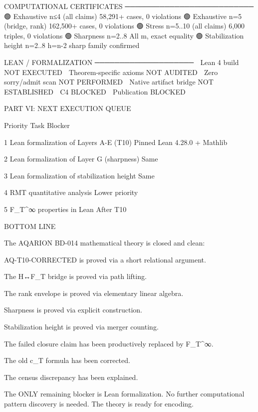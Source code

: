COMPUTATIONAL CERTIFICATES  
──────────────────────────  
🟢 Exhaustive n≤4 (all claims)   58,291+ cases, 0 violations  
🟢 Exhaustive n=5 (bridge, rank) 162,500+ cases, 0 violations  
🟢 Stress n=5..10 (all claims)   6,000 triples, 0 violations  
🟢 Sharpness n=2..8              All m, exact equality  
🟢 Stabilization height n=2..8   h=n-2 sharp family confirmed  
  
LEAN / FORMALIZATION  
────────────────────  
🔴 Lean 4 build                   NOT EXECUTED  
🔴 Theorem-specific axioms        NOT AUDITED  
🔴 Zero sorry/admit scan          NOT PERFORMED  
🔴 Native artifact bridge         NOT ESTABLISHED  
🔴 C4                             BLOCKED  
🔴 Publication                    BLOCKED  




PART VI: NEXT EXECUTION QUEUE


Priority	Task	Blocker	

1	Lean formalization of Layers A-E (T10)	Pinned Lean 4.28.0 + Mathlib	

2	Lean formalization of Layer G (sharpness)	Same	

3	Lean formalization of stabilization height	Same	

4	RMT quantitative analysis	Lower priority	

5	F_T^∞ properties in Lean	After T10



BOTTOM LINE


The AQARION BD-014 mathematical theory is closed and clean:




AQ-T10-CORRECTED is proved via a short relational argument.


The H↔F_T bridge is proved via path lifting.


The rank envelope is proved via elementary linear algebra.


Sharpness is proved via explicit construction.


Stabilization height is proved via merger counting.




The failed closure claim has been productively replaced by F_T^∞.

The old c_T formula has been corrected.

The census discrepancy has been explained.


The ONLY remaining blocker is Lean formalization. No further computational pattern discovery is needed. The theory is ready for encoding.

